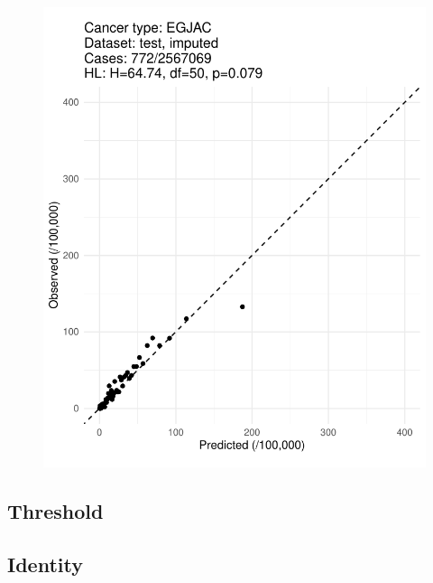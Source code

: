 \documentclass[12pt]{article}
\begin{document}
\begin{figure}[ht]
\includegraphics[width=1.0\linewidth]{calibration/EGJAC_imputed.pdf}
\end{figure}



\newpage
\clearpage
\subsection{Threshold}









\newpage
\clearpage
\subsection{Identity}
\end{document}
